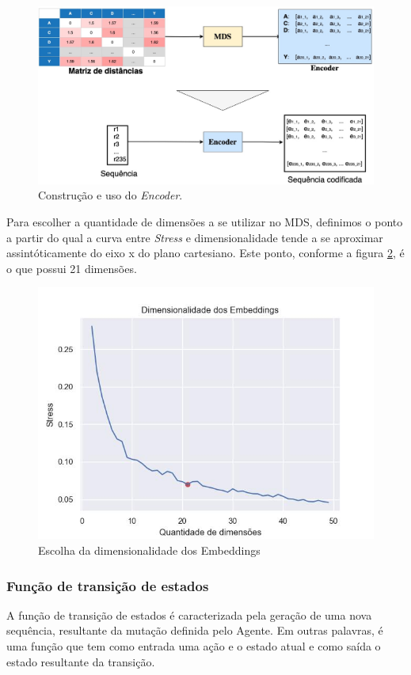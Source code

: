 \begin{figure}[H]
  \centering
  \includegraphics[width=.8\textwidth]{figuras/metodologia-encoder.jpg}
  \caption{Construção e uso do \textit{Encoder}. }
  \label{fig:encoder}
\end{figure}

Para escolher a quantidade de dimensões a se utilizar no MDS, definimos o ponto a partir do qual a curva entre \textit{Stress} e dimensionalidade 
tende a se aproximar assintóticamente do eixo x do plano cartesiano. Este ponto, conforme a figura \ref{fig:best_dim}, é o que possui 21 dimensões. 

\begin{figure}[H]
  \centering
  \includegraphics[width=.8\textwidth]{figuras/best_dim.jpg}
  \caption{Escolha da dimensionalidade dos Embeddings}
  \label{fig:best_dim}
\end{figure}



\subsubsection{Função de transição de estados}
A função de transição de estados é caracterizada pela geração de uma nova sequência, 
resultante da mutação definida pelo Agente. 
Em outras palavras, é uma função que tem como entrada uma ação e o estado atual e como saída o estado resultante da transição. 

